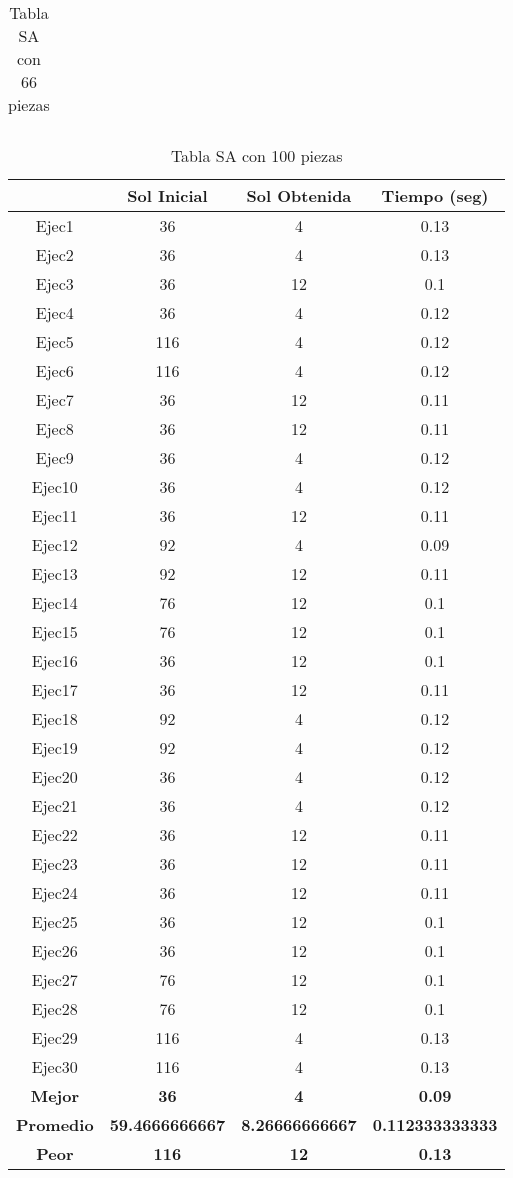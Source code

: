 \begin{center}
\begin{table}
\begin{tabular}{|c|c|c|c|}
\end{tabular}
\caption{Tabla SA con 66 piezas}
\end{table}

\begin{table}
\begin{tabular}{|c|c|c|c|}
\hline
 & {\bf Sol Inicial} & {\bf Sol Obtenida} & {\bf Tiempo (seg)} \\
\hline
Ejec1 & 36 & 4  & 0.13 \\
\hline
Ejec2 & 36 & 4  & 0.13 \\
\hline
Ejec3 & 36 & 12  & 0.1 \\
\hline
Ejec4 & 36 & 4  & 0.12 \\
\hline
Ejec5 & 116 & 4  & 0.12 \\
\hline
Ejec6 & 116 & 4  & 0.12 \\
\hline
Ejec7 & 36 & 12  & 0.11 \\
\hline
Ejec8 & 36 & 12  & 0.11 \\
\hline
Ejec9 & 36 & 4  & 0.12 \\
\hline
Ejec10 & 36 & 4  & 0.12 \\
\hline
Ejec11 & 36 & 12  & 0.11 \\
\hline
Ejec12 & 92 & 4  & 0.09 \\
\hline
Ejec13 & 92 & 12  & 0.11 \\
\hline
Ejec14 & 76 & 12  & 0.1 \\
\hline
Ejec15 & 76 & 12  & 0.1 \\
\hline
Ejec16 & 36 & 12  & 0.1 \\
\hline
Ejec17 & 36 & 12  & 0.11 \\
\hline
Ejec18 & 92 & 4  & 0.12 \\
\hline
Ejec19 & 92 & 4  & 0.12 \\
\hline
Ejec20 & 36 & 4  & 0.12 \\
\hline
Ejec21 & 36 & 4  & 0.12 \\
\hline
Ejec22 & 36 & 12  & 0.11 \\
\hline
Ejec23 & 36 & 12  & 0.11 \\
\hline
Ejec24 & 36 & 12  & 0.11 \\
\hline
Ejec25 & 36 & 12  & 0.1 \\
\hline
Ejec26 & 36 & 12  & 0.1 \\
\hline
Ejec27 & 76 & 12  & 0.1 \\
\hline
Ejec28 & 76 & 12  & 0.1 \\
\hline
Ejec29 & 116 & 4  & 0.13 \\
\hline
Ejec30 & 116 & 4  & 0.13 \\
\hline
{\bf Mejor} & {\bf 36} & {\bf 4} & {\bf 0.09} \\
\hline
{\bf Promedio} & {\bf 59.4666666667} & {\bf 8.26666666667} & {\bf 0.112333333333} \\
\hline
{\bf Peor} & {\bf 116} & {\bf 12} & {\bf 0.13} \\
\hline
\end{tabular}
\caption{Tabla SA con 100 piezas}
\end{table}

\end{center}


